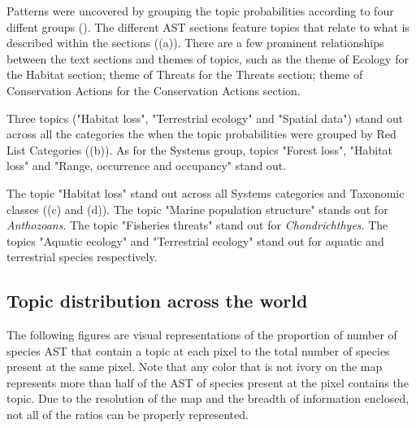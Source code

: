 Patterns were uncovered by grouping the topic probabilities according to four diffent groups (). The different AST sections feature topics that relate to what is described within the sections ((a)). There are a few prominent relationships between the text sections and themes of topics, such as the theme of Ecology for the Habitat section; theme of Threats for the Threats section; theme of Conservation Actions for the Conservation Actions section.

Three topics ("Habitat loss", "Terrestrial ecology" and "Spatial data") stand out across all the categories the when the topic probabilities were grouped by Red List Categories ((b)). As for the Systems group, topics "Forest loss", "Habitat loss" and "Range, occurrence and occupancy" stand out.

The topic "Habitat loss" stand out across all Systems categories and Taxonomic classes ((c) and (d)). The topic "Marine population structure" stands out for \textit{Anthozoans}. The topic "Fisheries threats" stand out for \textit{Chondrichthyes}. The topics "Aquatic ecology" and "Terrestrial ecology" stand out for aquatic and terrestrial species respectively.

\subsection{Topic distribution across the world}

The following figures are visual representations of the proportion of number of species AST that contain a topic at each pixel to the total number of species present at the same pixel. Note that any color that is not ivory on the map represents more than half of the AST of species present at the pixel contains the topic. Due to the resolution of the map and the breadth of information enclosed, not all of the ratios can be properly represented.

